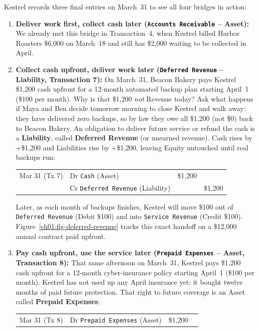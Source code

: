 Kestrel records three final entries on March~31 to see all four bridges in action:

\begin{enumerate}
  \item \textbf{Deliver work first, collect cash later (\texttt{Accounts Receivable} -- Asset):} We already met this bridge in Transaction~4, when Kestrel billed Harbor Roasters \$6,000 on March~18 and still has \$2,000 waiting to be collected in April.
  \item \textbf{Collect cash upfront, deliver work later (\texttt{Deferred Revenue} -- Liability, Transaction 7):} On March~31, Beacon Bakery pays Kestrel \$1,200 cash upfront for a 12-month automated backup plan starting April~1 (\$100 per month). Why is that \$1,200 \emph{not} Revenue today? Ask what happens if Maya and Ben decide tomorrow morning to close Kestrel and walk away: they have delivered zero backups, so by law they owe all \$1,200 (not \$0) back to Beacon Bakery. An obligation to deliver future service or refund the cash is a \textbf{Liability}, called \textbf{Deferred Revenue} (or unearned revenue). Cash rises by +\$1,200 and Liabilities rise by +\$1,200, leaving Equity untouched until real backups run:
  \begin{center}
  \small
  \begin{tabular}{@{}llrr@{}}
  Mar 31 (Tx 7) & Dr \texttt{Cash} (Asset) & \$1,200 & \\
                & \quad Cr \texttt{Deferred Revenue} (Liability) & & \$1,200
  \end{tabular}
  \end{center}
  Later, as each month of backups finishes, Kestrel will move \$100 out of \texttt{Deferred Revenue} (Debit \$100) and into \texttt{Service Revenue} (Credit \$100). Figure~\ref{ch01:fig-deferred-revenue} tracks this exact handoff on a \$12,000 annual contract paid upfront.
  \item \textbf{Pay cash upfront, use the service later (\texttt{Prepaid Expenses} -- Asset, Transaction 8):} That same afternoon on March~31, Kestrel pays \$1,200 cash upfront for a 12-month cyber-insurance policy starting April~1 (\$100 per month). Kestrel has not used up any April insurance yet; it bought twelve months of paid future protection. That right to future coverage is an Asset called \textbf{Prepaid Expenses}:
  \begin{center}
  \small
  \begin{tabular}{@{}llrr@{}}
  Mar 31 (Tx 8) & Dr \texttt{Prepaid Expenses} (Asset) & \$1,200 & \\

\end{tabular}
\end{center}
\end{enumerate}
